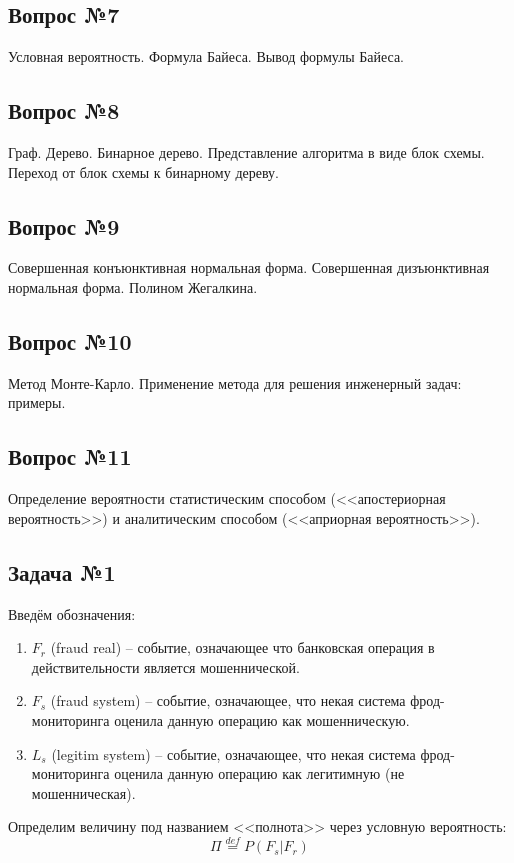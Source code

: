 \documentclass[english,russian,12pt]{article}
\begin{document}
\subsection*{Вопрос №7}
Условная вероятность. 
Формула Байеса. 
Вывод формулы Байеса.

\subsection*{Вопрос №8}
Граф. Дерево. Бинарное дерево.
Представление алгоритма в виде блок схемы.
Переход от блок схемы к бинарному дереву. 


\subsection*{Вопрос №9}
Совершенная конъюнктивная нормальная форма.
Совершенная дизъюнктивная нормальная форма.
Полином Жегалкина.

\subsection*{Вопрос №10}
Метод Монте-Карло.
Применение метода для решения инженерный задач: примеры.

\subsection*{Вопрос №11}
Определение вероятности статистическим способом
(<<апостериорная вероятность>>)
и аналитическим способом
(<<априорная вероятность>>).


\newpage
\subsection*{Задача №1}
Введём обозначения:
\begin{enumerate}
	\item $F_r$ (fraud real) -- событие, означающее что банковская операция в действительности является мошеннической. 
	\item $F_s$ (fraud system) -- событие, означающее, что некая система фрод-мониторинга оценила данную операцию как мошенническую.
	\item $L_s$ (legitim system) -- событие, означающее, что некая система фрод-мониторинга оценила данную операцию как легитимную (не мошенническая).
\end{enumerate}

Определим величину под названием <<полнота>> через условную вероятность:
\begin{equation}
\Pi \stackrel{def}{=} P(F_s | F_r)
\end{equation}
\end{document}
